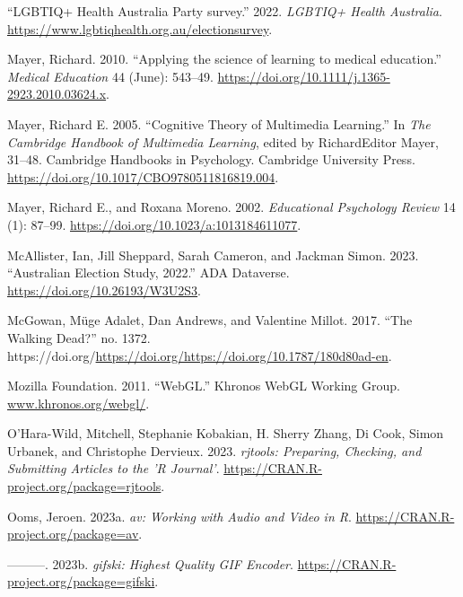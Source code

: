 \begin{CSLReferences}{1}{0}
\leavevmode{}%
{``{LGBTIQ+ Health Australia Party survey}.''} 2022. \emph{LGBTIQ+ Health Australia}. \url{https://www.lgbtiqhealth.org.au/electionsurvey}.

\leavevmode{}%
Mayer, Richard. 2010. {``{Applying the science of learning to medical education}.''} \emph{Medical Education} 44 (June): 543--49. \url{https://doi.org/10.1111/j.1365-2923.2010.03624.x}.

\leavevmode{}%
Mayer, Richard E. 2005. {``{Cognitive Theory of Multimedia Learning}.''} In \emph{The Cambridge Handbook of Multimedia Learning}, edited by RichardEditor Mayer, 31--48. Cambridge Handbooks in Psychology. Cambridge University Press. \url{https://doi.org/10.1017/CBO9780511816819.004}.

\leavevmode{}%
Mayer, Richard E., and Roxana Moreno. 2002. \emph{Educational Psychology Review} 14 (1): 87--99. \url{https://doi.org/10.1023/a:1013184611077}.

\leavevmode{}%
McAllister, Ian, Jill Sheppard, Sarah Cameron, and Jackman Simon. 2023. {``{Australian Election Study, 2022}.''} ADA Dataverse. \url{https://doi.org/10.26193/W3U2S3}.

\leavevmode{}%
McGowan, Müge Adalet, Dan Andrews, and Valentine Millot. 2017. {``{The Walking Dead?}''} no. 1372. https://doi.org/\url{https://doi.org/https://doi.org/10.1787/180d80ad-en}.

\leavevmode{}%
Mozilla Foundation. 2011. {``{WebGL}.''} Khronos WebGL Working Group. \href{https://www.khronos.org/webgl/}{www.khronos.org/webgl/}.

\leavevmode{}%
O'Hara-Wild, Mitchell, Stephanie Kobakian, H. Sherry Zhang, Di Cook, Simon Urbanek, and Christophe Dervieux. 2023. \emph{{rjtools: Preparing, Checking, and Submitting Articles to the 'R Journal'}}. \url{https://CRAN.R-project.org/package=rjtools}.

\leavevmode{}%
Ooms, Jeroen. 2023a. \emph{{av: Working with Audio and Video in R}}. \url{https://CRAN.R-project.org/package=av}.

\leavevmode{}%
---------. 2023b. \emph{{gifski: Highest Quality GIF Encoder}}. \url{https://CRAN.R-project.org/package=gifski}.


\end{CSLReferences}
